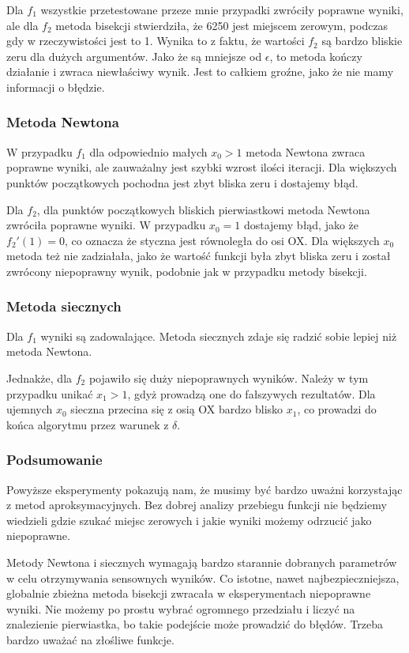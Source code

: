 \documentclass{article}
\begin{document}
Dla $f_1$ wszystkie przetestowane przeze mnie przypadki zwróciły poprawne wyniki, ale dla $f_2$ metoda bisekcji stwierdziła, że 6250 jest miejscem zerowym, podczas gdy w rzeczywistości jest to 1.
Wynika to z faktu, że wartości $f_2$ są bardzo bliskie zeru dla dużych argumentów.
Jako że są mniejsze od $\epsilon$, to metoda kończy działanie i zwraca niewłaściwy wynik.
Jest to całkiem groźne, jako że nie mamy informacji o błędzie.

\subsubsection{Metoda Newtona}
W przypadku $f_1$ dla odpowiednio małych $x_0 > 1$ metoda Newtona zwraca poprawne wyniki, ale zauważalny jest szybki wzrost ilości iteracji.
Dla większych punktów początkowych pochodna jest zbyt bliska zeru i dostajemy błąd.

Dla $f_2$, dla punktów początkowych bliskich pierwiastkowi metoda Newtona zwróciła poprawne wyniki.
W przypadku $x_0 = 1$ dostajemy błąd, jako że $f_2'(1) = 0$, co oznacza że styczna jest równoległa do osi OX.
Dla większych $x_0$ metoda też nie zadziałała, jako że wartość funkcji była zbyt bliska zeru i został zwrócony niepoprawny wynik, podobnie jak w przypadku metody bisekcji.

\subsubsection{Metoda siecznych}
Dla $f_1$ wyniki są zadowalające. Metoda siecznych zdaje się radzić sobie lepiej niż metoda Newtona.

Jednakże, dla $f_2$ pojawiło się duży niepoprawnych wyników. Należy w tym przypadku unikać $x_1 > 1$, gdyż prowadzą one do fałszywych rezultatów.
Dla ujemnych $x_0$ sieczna przecina się z osią OX bardzo blisko $x_1$, co prowadzi do końca algorytmu przez warunek z $\delta$.

\subsubsection{Podsumowanie}
Powyższe eksperymenty pokazują nam, że musimy być bardzo uważni korzystając z metod aproksymacyjnych.
Bez dobrej analizy przebiegu funkcji nie będziemy wiedzieli gdzie szukać miejsc zerowych i jakie wyniki możemy odrzucić jako niepoprawne.

Metody Newtona i siecznych wymagają bardzo starannie dobranych parametrów w celu otrzymywania sensownych wyników.
Co istotne, nawet najbezpieczniejsza, globalnie zbieżna metoda bisekcji zwracała w eksperymentach niepoprawne wyniki.
Nie możemy po prostu wybrać ogromnego przedziału i liczyć na znalezienie pierwiastka, bo takie podejście może prowadzić do błędów.
Trzeba bardzo uważać na złośliwe funkcje.
\end{document}
